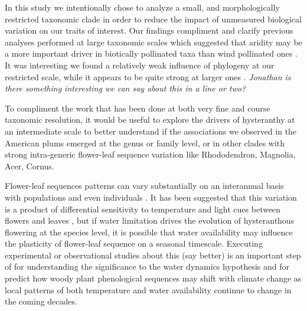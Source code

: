 \documentclass{article}[11pt]
\begin{document}
In this study we intentionally chose to analyze a small, and morphologically restricted taxonomic clade in order to reduce the impact of unmeasured biological variation on our traits of interest. Our findings compliment and clarify previous analyses performed at large taxonomic scales which suggested that aridity may be a more important driver in biotically pollinated taxa than wind pollinated ones \citep{}. It was interesting we found a relatively weak influence of phylogeny at our restricted scale, while it appears to be quite strong at larger ones 
\citep{}. \textit{Jonathan is there something interesting we can say about this in a line or two?}

To compliment the work that has been done at both very fine and course taxonomic resolution, it would be useful to explore the drivers of hysteranthy at an intermediate scale to better understand if the associations we observed in the American plums emerged at the genus or family level, or in other clades with strong intra-generic flower-leaf sequence variation like Rhododendron, Magnolia, Acer, Cornus. 

Flower-leaf sequences patterns can vary substantially on an interannual basis with populations and even individuals \citep{}. It has been suggested that this variation is a product of differential sensitivity to temperature and light cues between flowers and leaves \citep{}, but if water limitation drives the evolution of hysteranthous flowering at the species level, it is possible that water availability may influence the plasticity of flower-leaf sequence on a seasonal timescale. Executing experimental or observational studies about this (say better) is an important step of for understanding the significance to the water dynamics hypothesis and for predict how woody plant phenological sequences may shift with climate change as local patterns of both temperature and water availability continue to change in the coming decades.




 

\newpage
\end{document}
